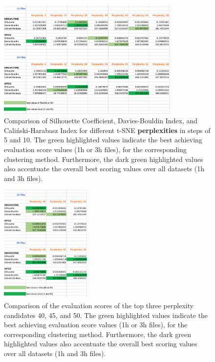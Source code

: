 \begin{figure}
  \centering
  \includegraphics[width=0.8\textwidth]{./images/tsneParametersTest/perplexity/perplexityEvaluationScores.png}
  \caption{Comparison of Silhouette Coefficient, Davies-Bouldin Index, and Caliński-Harabasz Index for different t-SNE \textbf{perplexities} in steps of 5 and 10. The green highlighted values indicate the best achieving evaluation score values (1h or 3h files), for the corresponding clustering method. Furthermore, the dark green highlighted values also accentuate the overall best scoring values over all datasets (1h and 3h files).}
  \label{figure:perplexityEvaluationScores}
\end{figure}

\begin{figure}
  \centering
  \includegraphics[width=0.4\textwidth]{./images/tsneParametersTest/perplexity/perplexityEvaluationScoresDetailed.png}
  \caption{Comparison of the evaluation scores of the top three perplexity candidates 40, 45, and 50. The green highlighted values indicate the best achieving evaluation score values (1h or 3h files), for the corresponding clustering method. Furthermore, the dark green highlighted values also accentuate the overall best scoring values over all datasets (1h and 3h files).}
  \label{figure:perplexityEvaluationScoresDetailed}
\end{figure}


